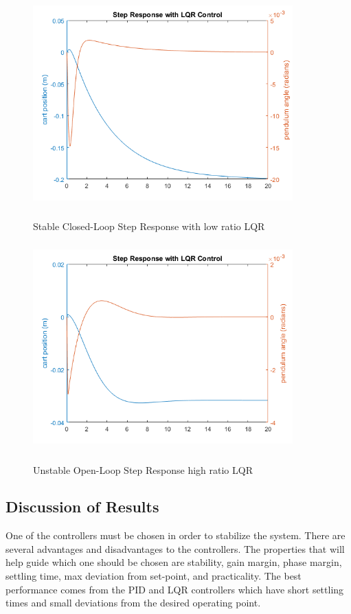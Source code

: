 \documentclass[12pt]{article} %
\begin{document}
\begin{figure}[h]
\caption{Stable Closed-Loop Step Response with low ratio LQR}
\includegraphics[height=8cm, width=10cm]{LQR11.png}
\label{fig:lqrresult2}
\centering
\end{figure}
\FloatBarrier
\begin{figure}[h]
\caption{Unstable Open-Loop Step Response high ratio LQR}
\includegraphics[height=8cm, width=10cm]{LQR404000.png}
\label{fig:lqrresult1}
\centering
\end{figure}
\subsection{Discussion of Results}
One of the controllers must be chosen in order to stabilize the system. There are several advantages and disadvantages to the controllers. The properties that will help guide which one should be chosen are stability, gain margin, phase margin, settling time, max deviation from set-point, and practicality. The best performance comes from the PID and LQR controllers which have short settling times and small deviations from the desired operating point. 
\end{document}
